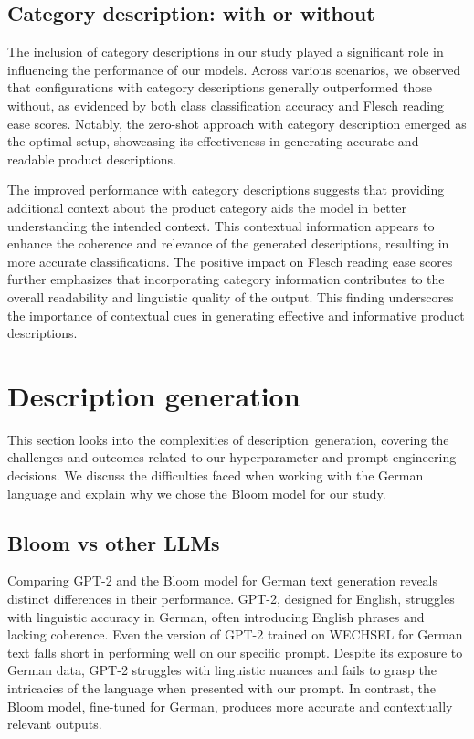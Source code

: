 \subsection{Category description: with or without}

The inclusion of category descriptions in our study played a significant role in influencing the performance of our models. Across various scenarios, we observed that configurations with category descriptions generally outperformed those without, as evidenced by both class classification accuracy and Flesch reading ease scores. Notably, the zero-shot approach with category description emerged as the optimal setup, showcasing its effectiveness in generating accurate and readable product descriptions.

The improved performance with category descriptions suggests that providing additional context about the product category aids the model in better understanding the intended context. This contextual information appears to enhance the coherence and relevance of the generated descriptions, resulting in more accurate classifications. The positive impact on Flesch reading ease scores further emphasizes that incorporating category information contributes to the overall readability and linguistic quality of the output. This finding underscores the importance of contextual cues in generating effective and informative product descriptions.

\section{Description generation}

This section looks into the complexities of description generation, covering the challenges and outcomes related to our hyperparameter and prompt engineering decisions. We discuss the difficulties faced when working with the German language and explain why we chose the Bloom model for our study.

\subsection{Bloom vs other LLMs}
Comparing GPT-2 and the Bloom model for German text generation reveals distinct differences in their performance. GPT-2, designed for English, struggles with linguistic accuracy in German, often introducing English phrases and lacking coherence. Even the version of GPT-2 trained on WECHSEL for German text falls short in performing well on our specific prompt. Despite its exposure to German data, GPT-2 struggles with linguistic nuances and fails to grasp the intricacies of the language when presented with our prompt. In contrast, the Bloom model, fine-tuned for German, produces more accurate and contextually relevant outputs.

